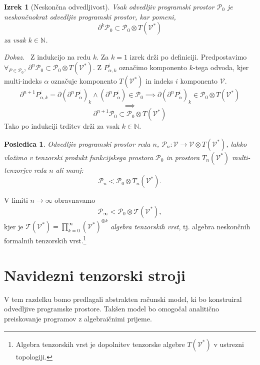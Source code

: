\documentclass[a4paper, 12pt]{book}
\newcommand{\T}{\mathcal{T}}
\newcommand{\VV}{\mathcal{V}}
\newcommand{\dP}{\mathcal{P}}
\newcommand{\D}{\partial}
\newtheorem{posledica}{Posledica}[chapter]
\newtheorem{izrek}{Izrek}[chapter]
\newenvironment{dokaz}{\emph{Dokaz.}\ }{\hspace{\fill}{$\Box$}}
\begin{document}
\begin{izrek}[Neskončna odvedljivost]\label{thm:infDif}
Vsak odvedljiv programski prostor $\dP_0$ je \emph{neskončnokrat odvedljiv programski prostor}, kar pomeni,
\begin{equation}\label{eq:P_n}
	 		\D^k\dP_0\subset\dP_0\otimes T(\VV^*)
	 	\end{equation}
za vsak $k\in\mathbb{N}$.
\end{izrek}
\begin{dokaz}
Z indukcijo na redu $k$. Za $k=1$ izrek drži po definiciji. Predpostavimo $\forall_{P\in\dP_0}$,
  $\D^n\dP_0\subset\dP_0\otimes T(\VV^*)$. Z $P_{\alpha,k}^i$ označimo komponento $k$-tega odvoda, kjer multi-indeks $\alpha$ označuje komponento $T(\VV^*)$ in indeks $i$ komponento $\VV$.
	\begin{equation}\label{eq:inductionStep}
\D^{n+1}P_{\alpha,k}^i=\D(\D^n P^i_\alpha)_k\land(\D^n P^i_\alpha)\in\dP_0\implies \D(\D^n P^i_\alpha)_k\in \dP_0\otimes T(\VV^*)
	\end{equation}
	$$\implies$$
	$$\D^{n+1}\dP_0\subset\dP_0\otimes T(\VV^*)$$
Tako po indukciji trditev drži za vsak $k\in\mathbb{N}$.
\end{dokaz}
\begin{posledica}\label{tenProdEmb}
Odvedljiv programski prostor reda $n$, $\dP_n:\VV\to\VV\otimes T(\VV^*)$, lahko vložimo v tenzorski produkt funkcijskega prostora $\dP_0$ in prostora $T_n(\VV^*)$ multi-tenzorjev reda $n$ ali manj:
\begin{equation}
    \label{eq:D_p_embed}
    \dP_n<\dP_0\otimes T_n(\VV^*).
  \end{equation}
\end{posledica}

V limiti $n\to\infty$ obravnavamo
\begin{equation}
 	\label{eq:P_algebra}
 	 	    \dP_\infty < \dP_0\otimes \T(\VV^*),
 	\end{equation}
kjer je $\T(\VV^*)=\prod_{k=0}^\infty (\VV^*)^{\otimes k}$ \emph{algebra tenzorskih vrst}, tj. algebra neskončnih formalnih tenzorskih vrst.\footnote{Algebra tenzorskih vrst je dopolnitev tenzorske algebre $T(\VV^*)$ v ustrezni topologiji.}

\section{Navidezni tenzorski stroji}

V tem razdelku bomo predlagali abstrakten računski model, ki bo konstruiral odvedljive programske prostore. Takšen model bo omogočal analitično preiskovanje programov z algebraičnimi prijeme.
\end{document}
